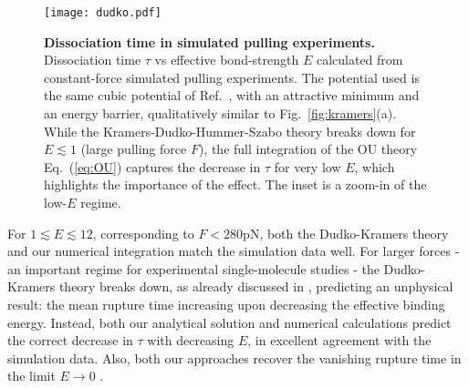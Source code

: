 \documentclass[twocolumn,pre,aps,showpacs,a4paper,floatfix,amssymb]{revtex4-1}
\newcommand{\refeq}[1]{Eq.~(\ref{#1})}
\newcommand{\refref}[1]{Ref.~\cite{#1}}
\newcommand{\refig}[1]{Fig.~\ref{#1}}
\begin{document}
\begin{figure}
\texttt{[image: dudko.pdf]}
\caption{{\bf Dissociation time in simulated pulling experiments.} 
Dissociation time $\tau$ vs effective bond-strength $E$ calculated from constant-force simulated pulling experiments. The potential used is the same cubic potential of Ref.~\cite{dudko2006intrinsic}, with an attractive minimum and an energy barrier, qualitatively similar to \refig{fig:kramers}(a). 
While the Kramers-Dudko-Hummer-Szabo theory \cite{dudko2006intrinsic} breaks down for $E\lesssim 1$ (large pulling force $F$),
the full integration of the OU theory \refeq{eq:OU} captures the decrease in $\tau$ for very low $E$, which highlights the importance of the effect. The inset is a zoom-in of the low-$E$ regime. 
}
\label{fig:dudko}
\end{figure} 

For $1 \lesssim E \lesssim 12$, corresponding to $F<280\mathrm{pN}$,
both the Dudko-Kramers theory and our numerical integration match the simulation data well. For larger forces - an important regime for experimental single-molecule studies - the Dudko-Kramers theory breaks down, as already discussed in \cite{dudko2006intrinsic}, predicting an unphysical result: 
the mean rupture time increasing upon decreasing the effective binding energy.
Instead, both our analytical solution and numerical calculations predict the correct decrease in $\tau$ with decreasing $E$, in excellent agreement with the simulation data.
Also, both our approaches recover the vanishing rupture time in the limit $E\rightarrow 0$ \cite{footnoteIdentically}.
%
\end{document}
